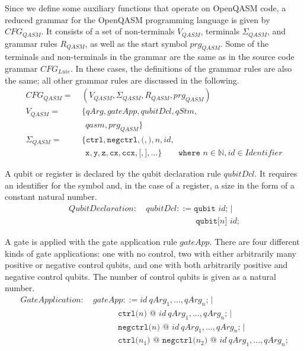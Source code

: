 Since we define some auxiliary functions that operate on OpenQASM code, a reduced grammar for the OpenQASM programming language is given by $CFG_{QASM}$. It consists of a set of non-terminals $V_{QASM}$, terminals $\Sigma_{QASM}$, and grammar rules $R_{QASM}$, as well as the start symbol $prg_{QASM}$. Some of the terminals and non-terminals in the grammar are the same as in the source code grammar $CFG_{Luie}$. In these cases, the definitions of the grammar rules are also the same; all other grammar rules are discussed in the following.
\begin{align*}
    CFG_{QASM} = \ & (V_{QASM}, \Sigma_{QASM}, R_{QASM}, prg_{QASM} )\\ 
    V_{QASM} = \ & \{ qArg, gateApp, qubitDcl, qStm,\\ 
            & \ \  qasm, prg_{QASM}\}\\ 
    \Sigma_{QASM} = \ & \{\texttt{ctrl}, \texttt{negctrl}, \texttt{(}, \texttt{)}, n, id,  \\
               & \ \ \texttt{x}, \texttt{y}, \texttt{z}, \texttt{cx}, \texttt{ccx}, \texttt{[}, \texttt{]}, \dots \}  
               \quad \quad \texttt{where } n \in \mathbb{N}, id \in Identifier
\end{align*}

A qubit or register is declared by the qubit declaration rule $qubitDcl$. It requires an identifier for the symbol and, in the case of a register, a size in the form of a constant natural number. 
\begin{align*}
    QubitDeclaration: \ & qubitDcl::= \texttt{qubit } id \texttt{;} \mid\\
    & \hspace{6em} \texttt{qubit[}n\texttt{] } id \texttt{;}
\end{align*}

A gate is applied with the gate application rule $gateApp$. There are four different kinds of gate applications: one with no control, two with either arbitrarily many positive or negative control qubits, and one with both arbitrarily positive and negative control qubits. The number of control qubits is given as a natural number. 
\begin{align*}
GateApplication: \ & gateApp::= id \ qArg_1, ..., qArg_n \texttt{;}\mid\\
& \quad \quad \quad \texttt{ctrl(}n\texttt{)} \texttt{ @ } id \ qArg_1, ..., qArg_n \texttt{;} \mid\\
& \quad \quad \quad \texttt{negctrl(}n\texttt{)} \texttt{ @ } id \ qArg_1, ..., qArg_n \texttt{;} \mid\\
    & \quad \quad \quad \texttt{ctrl(}n_1\texttt{)} \texttt{ @ } \texttt{negctrl(}n_2\texttt{)} \texttt{ @ } id \ qArg_1, ..., qArg_n \texttt{;}
\end{align*}

